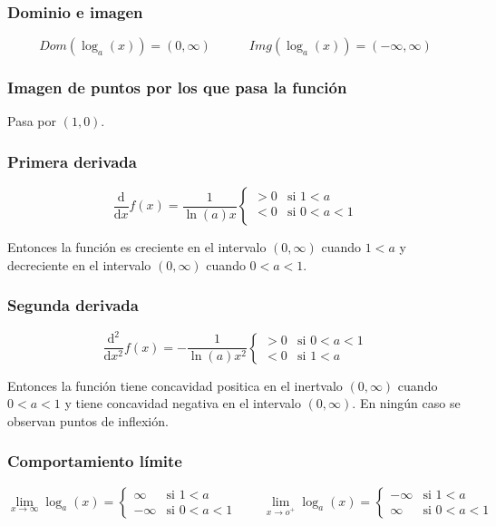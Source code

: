 \documentclass{article}
\numberwithin{equation}{section}
\newcommand{\der}[1]{\frac{\mathrm{d}}{\mathrm{d}#1}}
\newcommand{\derivada}[2]{\frac{\mathrm{d}^{#1}}{\mathrm{d}#2}}
\newcommand{\limit}[2]{\lim_{#1\to #2}}
\newcommand{\limf}[1]{\lim_{#1\to\infty}}
\begin{document}
\subsubsection{Dominio e imagen}
$$Dom\left( \log_a(x) \right)=(0,\infty) \quad\quad\quad Img\left(\log_a(x)\right)=(-\infty,\infty)$$

\subsubsection{Imagen de puntos por los que pasa la función}

Pasa por $(1,0)$.

\subsubsection{Primera derivada}

$$\der{x}f(x)=\frac{1}{\ln(a)x}
\left\{
    \begin{array}{ll}
        >0  & \mbox{si } 1<a \\
        <0 & \mbox{si } 0<a<1 \\
    \end{array}
\right.$$

Entonces la función es creciente en el intervalo $(0,\infty)$ cuando $1<a$ y decreciente en el intervalo $(0,\infty)$ cuando $0<a<1$.

\subsubsection{Segunda derivada}
$$\derivada{2}{x^2}f(x)=-\frac{1}{\ln(a)x^2}
\left\{
\begin{array}{ll}
    >0 & \mbox{si } 0<a<1 \\
    <0 & \mbox{si } 1<a
\end{array}
\right.$$

Entonces la función tiene concavidad positica en el inertvalo $(0,\infty)$ cuando $0<a<1$ y tiene concavidad negativa en el intervalo $(0,\infty)$. En ningún caso se observan puntos de inflexión.

\subsubsection{Comportamiento límite}

$$
\limf{x}\log_a(x)=\left\{
\begin{array}{ll}
    \infty & \mbox{si } 1<a \\
    -\infty & \mbox{si } 0<a<1
\end{array}    
\right. 
\quad\quad 
\limit{x}{o^+} \log_a(x)=\left\{
\begin{array}{ll}
    -\infty & \mbox{si } 1<a \\
    \infty & \mbox{si } 0<a<1
\end{array}    
\right. 
$$
\end{document}
